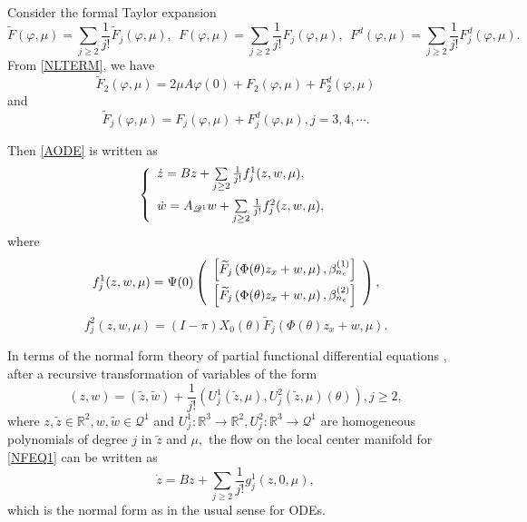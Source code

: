 \documentclass[11pt]{article}
\theoremstyle{definition}
\theoremstyle{remark}
\numberwithin{equation}{section}
\begin{document}
Consider the formal Taylor expansion
$$\widetilde{F}(\varphi, \mu)=\sum\limits_{j\geq 2}\frac{1}{j!}\widetilde{F}_j(\varphi, \mu),  ~~ F(\varphi, \mu)=\sum\limits_{j\geq 2}\frac{1}{j!} F_j(\varphi, \mu),  ~~ F^d(\varphi, \mu)=\sum\limits_{j\geq 2}\frac{1}{j!} F_j^d(\varphi, \mu).$$
From \eqref{NLTERM}, we have
\begin{equation}
\label{TLDF2MU}
\widetilde{F}_2( \varphi, \mu)=2\mu A\varphi(0)+
F_2(\varphi, \mu)+F_2^d(\varphi, \mu)
\end{equation}
and
\begin{equation}
\label{TLDF3MU}
\widetilde{F}_j( \varphi, \mu)=
F_j(\varphi, \mu) +F_j^d(\varphi, \mu), j=3, 4, \cdots.
\end{equation}


Then \eqref{AODE} is written as
$$
\left\{
\begin{array}{l}
  \dot{z}=Bz+\sum\limits_{j\geq 2} \frac{1}{j!}f^1_j(z, w, \mu),\vspace{0.2cm}\\
 \dot{w}=A_{\mathscr{Q}^1}w+ \sum\limits_{j\geq 2} \frac{1}{j!}f^2_j(z, w, \mu),
\end{array}
\right.
$$
where
\begin{equation}
\label{FJ1}
 f^1_j(z, w, \mu)=\Psi(0)\left(\begin{array}{c}\left[\widetilde{F}_j\left(\Phi(\theta) z_x+w,\mu\right),\beta_{n_c}^{(1)}\right]\vspace{0.1cm}\\
\left[\widetilde{F}_j\left(\Phi(\theta) z_x+w,\mu\right),\beta_{n_c}^{(2)}\right]
\end{array}\right),
\end{equation}
\begin{equation}
\label{FJ2}
 f^2_j(z, w, \mu)=(I-\pi)X_0(\theta) \widetilde{F}_j\left(\Phi(\theta) z_x+w, \mu\right).
\end{equation}


In terms of the normal form theory  of partial functional differential equations \cite{Faria-00TAMS}, after a recursive transformation of variables of the form
\begin{equation}
\label{TOV}
(z, w)=(\widetilde{z}, \widetilde{w})+\frac{1}{j!}\left(U_j^1(\widetilde{z}, \mu), U_j^2(\widetilde{z}, \mu)(\theta)\right), j\geq 2,
\end{equation}
where $z, \widetilde{z}\in \mathbb{R}^2, w, \widetilde{w}\in \mathscr{Q}^1$ and $U_j^1:\mathbb{R}^3\rightarrow  \mathbb{R}^2,U_j^2:\mathbb{R}^3\rightarrow  \mathscr{Q}^1$ are homogeneous polynomials of degree $j$ in $\widetilde{z}$ and $\mu,$
 the flow on the local center manifold for \eqref{NFEQ1} can be written as
\begin{equation}
\label{NF}
  \dot{z}=Bz+\sum\limits_{j\geq2}\frac{1}{j!}g_j^1(z,0,\mu),
\end{equation}
which is the normal form as in the usual sense for ODEs.
\end{document}
